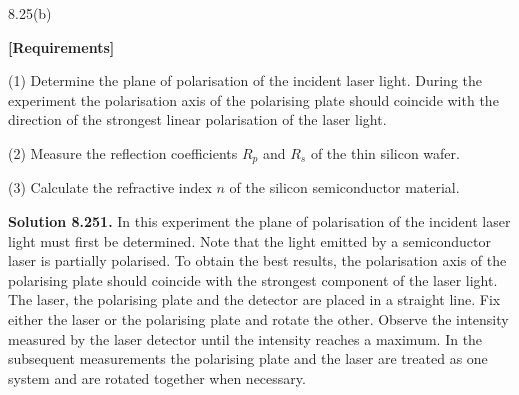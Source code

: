 \begin{figbox}{8.25(b)}
\end{figbox}

\textbf{[Requirements]}

(1) Determine the plane of polarisation of the incident laser light. During the experiment the polarisation axis of the polarising plate should coincide with the direction of the strongest linear polarisation of the laser light.

(2) Measure the reflection coefficients $R_p$ and $R_s$ of the thin silicon wafer.

(3) Calculate the refractive index $n$ of the silicon semiconductor material.

\textbf{Solution 8.25}\quad \textbf{1.} In this experiment the plane of polarisation of the incident laser light must first be determined. Note that the light emitted by a semiconductor laser is partially polarised. To obtain the best results, the polarisation axis of the polarising plate should coincide with the strongest component of the laser light. The laser, the polarising plate and the detector are placed in a straight line. Fix either the laser or the polarising plate and rotate the other. Observe the intensity measured by the laser detector until the intensity reaches a maximum. In the subsequent measurements the polarising plate and the laser are treated as one system and are rotated together when necessary.

